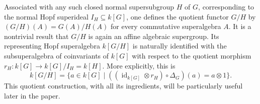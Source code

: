 \documentclass[11pt,a4paper,reqno,noamsfonts]{amsart}
\numberwithin{equation}{section}
\theoremstyle{definition}
\theoremstyle{remark}
\DeclareMathOperator{\id}{id}
\begin{document}
Associated with any such closed normal supersubgroup $H$ of $G$, corresponding to the normal Hopf superideal $I_H \subseteq k[G]$, one defines the quotient functor $G/H$ by $(G/H)(A) = G(A)/H(A)$ for every commutative superalgebra $A$. It is a nontrivial result that $G/H$ is again an affine algebraic supergroup. Its representing Hopf superalgebra $k[G/H]$ is naturally identified with the subsuperalgebra of coinvariants of $k[G]$ with respect to the quotient morphism $r_H \colon k[G] \to k[G]/I_H = k[H]$. More explicitly, this is
\begin{equation}
k[G/H] = \{ a \in k[G] \mid ((\id_{k[G]} \otimes r_H) \circ \Delta_G)(a) = a \otimes 1 \}.
\end{equation}
This quotient construction, with all its ingredients, will be particularly useful later in the paper.
\end{document}
